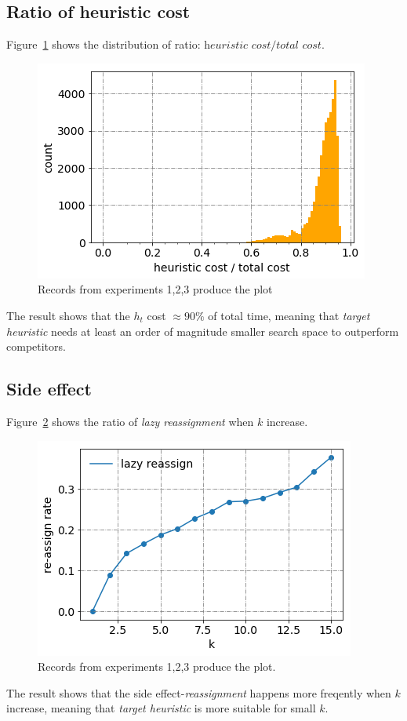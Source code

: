 \subsection{Ratio of heuristic cost}
Figure~\ref{hcost} shows the distribution of ratio:
$\textit{heuristic cost} / \textit{total cost}$.
\begin{figure}[htp]
  \centering
  \includegraphics[width=.7\linewidth]{./pic/hcost.png}
  \caption{\small Records from experiments 1,2,3 produce the plot}
  \label{hcost}
\end{figure}
The result shows that the $h_t$ cost $\approx 90\%$ of total time, meaning that
\textit{target heuristic} needs at least an order of magnitude smaller search space 
to outperform competitors.

\subsection{Side effect}
Figure~\ref{lazy_reassign} shows the ratio of \textit{lazy reassignment} when $k$ increase.
\begin{figure}[htp]
  \centering
  \includegraphics[width=.7\linewidth]{./pic/lazy_reassign.png}
  \caption{\small Records from experiments 1,2,3 produce the plot.}
  \label{lazy_reassign}
\end{figure}
The result shows that the side effect-\textit{reassignment} happens more freqently when $k$
increase, meaning that \textit{target heuristic} is more suitable for small $k$.

